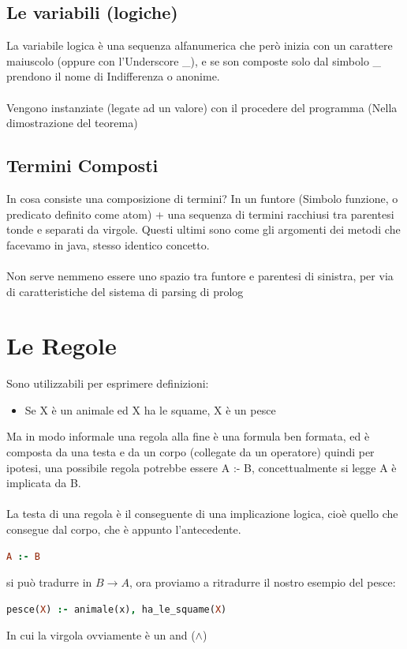 \documentclass[12pt, a4paper, openany, oneside]{book}
\begin{document}
\subsection{Le variabili (logiche)}
La variabile logica è una sequenza alfanumerica che però inizia con un carattere
maiuscolo (oppure con l'Underscore \_), e se son composte solo dal simbolo \_ 
prendono il nome di Indifferenza o anonime.
\\ \\
Vengono instanziate (legate ad un valore) con il procedere del programma 
(Nella dimostrazione del teorema)
\subsection{Termini Composti}
In cosa consiste una composizione di termini? In un \color{red} funtore
\color{black} (Simbolo funzione, o predicato definito come atom) +
una sequenza di termini racchiusi tra parentesi tonde e separati da virgole.
Questi ultimi sono come gli argomenti dei metodi che facevamo in java, stesso
identico concetto. \\ \\
Non serve nemmeno essere uno spazio tra funtore e parentesi di sinistra, per 
via di caratteristiche del sistema di parsing di prolog
\section{Le Regole}
Sono utilizzabili per esprimere definizioni:
\begin{itemize}
	\item Se X è un animale ed X ha le squame, X è un pesce
\end{itemize}
Ma in modo informale una regola alla fine è una formula ben formata, ed è composta
da una testa e da un corpo (collegate da un operatore) quindi per ipotesi, una 
possibile regola potrebbe essere A :- B, concettualmente si legge A è 
implicata da B.
\\ \\
La testa di una regola è il conseguente di una implicazione logica, cioè quello 
che consegue dal corpo, che è appunto l'antecedente.
\begin{lstlisting}[language = Prolog]
A :- B
\end{lstlisting} 
si può tradurre in $B \to A$, ora proviamo a ritradurre il nostro
esempio del pesce:
\begin{lstlisting}[language = Prolog]
pesce(X) :- animale(x), ha_le_squame(X)
\end{lstlisting} 
In cui la virgola ovviamente è un and ($\wedge$) \\ \\
\end{document}
